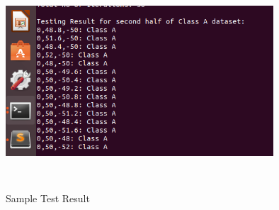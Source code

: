 \documentclass[letterpaper]{article}
\begin{document}
\begin{figure}[h]
\caption{Sample Test Result}
\centering
\includegraphics[width=10cm,height=8cm]{test_result}
\end{figure}
 
\end{document}
